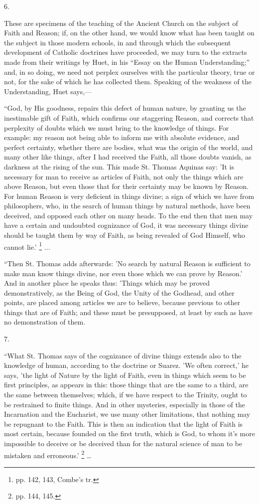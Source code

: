 6.

These are specimens of the teaching of the Ancient Church on the
subject of Faith and Reason; if, on the other hand, we would know what
has been taught on the subject in those modern schools, in and through
which the subsequent development of Catholic doctrines have proceeded,
we may turn to the extracts made from their writings by Huet, in his
``Essay on the Human Understanding;'' and, in so doing, we
need not perplex ourselves with the particular theory, true or not,
for the sake of which he has collected them. Speaking of the weakness
of the Understanding, Huet says,—

``God, by His goodness, repairs this
defect of human nature, by granting us the inestimable gift of Faith,
which confirms our staggering Reason, and corrects that perplexity of
doubts which we must bring to the knowledge of things. For example: my
reason not being able to inform me with absolute evidence, and perfect
certainty, whether there are bodies, what was the origin of the world,
and many other like things, after I had received the Faith, all those
doubts vanish, as darkness at the rising of the sun. This made St.
Thomas Aquinas say: 'It is necessary for man to receive as articles of
Faith, not only the things which are above Reason, but even those that
for their certainty may be known by Reason. For human Reason is very
deficient in things divine; a sign of which we have from philosophers,
who, in the search of human things by natural methods, have been
deceived, and opposed each other on many heads. To the end then that
men may have a certain and undoubted cognizance of God, it was
necessary things divine should be taught them by way of Faith, as
being revealed of God Himself, who cannot lie.' \footnote{pp. 142, 143, Combe's tr.} ...

``Then St. Thomas adds afterwards: 'No search by natural Reason
is sufficient to make man know things divine, nor even those which we
can prove by Reason.' And in another place he speaks thus: 'Things
which may be proved demonstratively, as the Being of God, the Unity of
the Godhead, and other points, are placed among articles we are to
believe, because previous to other things that are of Faith; and these
must be presupposed, at least by such as have no demonstration of
them.

7.

``What St. Thomas says of the cognizance of divine things
extends also to the knowledge of human, according to the doctrine or
Suarez. 'We often correct,' he says, 'the light of Nature by the light
of Faith, even in things which seem to be first principles, as appears
in this: those things that are the same to a third, are the same
between themselves; which, if we have respect to the Trinity, ought to
be restrained to finite things. And in other mysteries, especially in
those of the Incarnation and the Eucharist, we use many other
limitations, that nothing may be repugnant to the Faith. This is then
an indication that the light of Faith is most certain, because founded
on the first truth, which is God, to whom it's more impossible to
deceive or be deceived than for the natural science of man to be
mistaken and erroneous.' \footnote{pp. 144, 145.}
…

